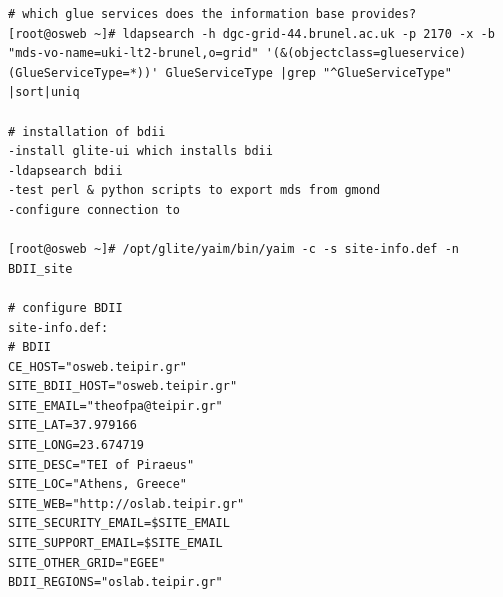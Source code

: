 \begin{verbatim}
# which glue services does the information base provides?
[root@osweb ~]# ldapsearch -h dgc-grid-44.brunel.ac.uk -p 2170 -x -b "mds-vo-name=uki-lt2-brunel,o=grid" '(&(objectclass=glueservice)(GlueServiceType=*))' GlueServiceType |grep "^GlueServiceType" |sort|uniq

# installation of bdii
-install glite-ui which installs bdii
-ldapsearch bdii
-test perl & python scripts to export mds from gmond
-configure connection to 

[root@osweb ~]# /opt/glite/yaim/bin/yaim -c -s site-info.def -n BDII_site

# configure BDII
site-info.def:
# BDII
CE_HOST="osweb.teipir.gr"
SITE_BDII_HOST="osweb.teipir.gr"
SITE_EMAIL="theofpa@teipir.gr"
SITE_LAT=37.979166
SITE_LONG=23.674719
SITE_DESC="TEI of Piraeus"
SITE_LOC="Athens, Greece"
SITE_WEB="http://oslab.teipir.gr"
SITE_SECURITY_EMAIL=$SITE_EMAIL
SITE_SUPPORT_EMAIL=$SITE_EMAIL
SITE_OTHER_GRID="EGEE"
BDII_REGIONS="oslab.teipir.gr"

\end{verbatim}

